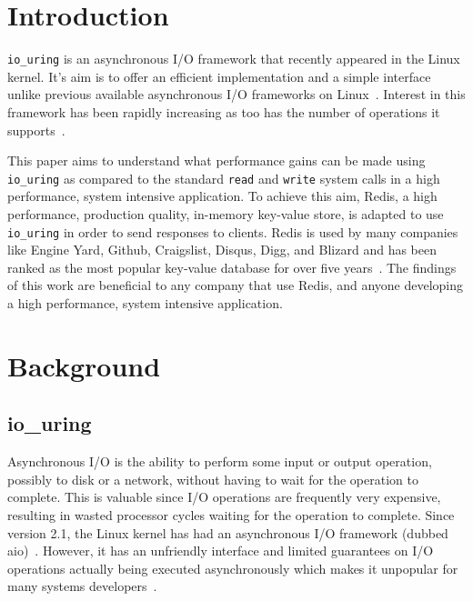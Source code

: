 \documentclass[sigconf]{acmart}
\newcommand{\inlinecode}[1]{\texttt{#1}}
\begin{document}
\maketitle

\section{Introduction}
\inlinecode{io\_uring} is an asynchronous I/O framework that recently appeared in the Linux kernel.
It's aim is to offer an efficient implementation and a simple interface unlike previous available asynchronous I/O frameworks on Linux~\cite{Bhattacharya2010AsynchronousIS}.
Interest in this framework has been rapidly increasing as too has the number of operations it supports~\cite{iouring-intro}.

This paper aims to understand what performance gains can be made using \inlinecode{io\_uring} as compared to the standard \inlinecode{read} and \inlinecode{write} system calls in a high performance, system intensive application.
To achieve this aim, Redis, a high performance, production quality, in-memory key-value store, is adapted to use \inlinecode{io\_uring} in order to send responses to clients.
Redis is used by many companies like Engine Yard, Github, Craigslist, Disqus, Digg, and Blizard and has been ranked as the most popular key-value database for over five years~\cite{macedo2011redis6,best-kv-store}.
The findings of this work are beneficial to any company that use Redis, and anyone developing a high performance, system intensive application.


\section{Background}

\subsection{io\_uring}
Asynchronous I/O is the ability to perform some input or output operation, possibly to disk or a network, without having to wait for the operation to complete.
This is valuable since I/O operations are frequently very expensive, resulting in wasted processor cycles waiting for the operation to complete.
Since version 2.1, the Linux kernel has had an asynchronous I/O framework (dubbed aio)~\cite{Bhattacharya2010AsynchronousIS}.
However, it has an unfriendly interface and limited guarantees on I/O operations actually being executed asynchronously which makes it unpopular for many systems developers~\cite{iouring}.
\end{document}
